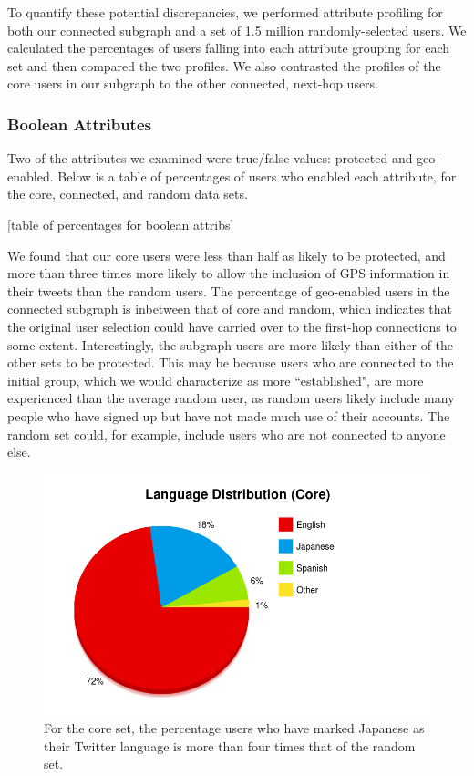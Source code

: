 To quantify these potential discrepancies, we performed attribute profiling for both our connected subgraph and a set of 1.5 million randomly-selected users.  We calculated the percentages of users falling into each attribute grouping for each set and then compared the two profiles.  We also contrasted the profiles of the core users in our subgraph to the other connected, next-hop users.

\subsubsection{Boolean Attributes}

Two of the attributes we examined were true/false values: protected and geo-enabled.  Below is a table of percentages of users who enabled each attribute, for the core, connected, and random data sets.

[table of percentages for boolean attribs]

We found that our core users were less than half as likely to be protected, and more than three times more likely to allow the inclusion of GPS information in their tweets than the random users.  The percentage of geo-enabled users in the connected subgraph is inbetween that of core and random, which indicates that the original user selection could have carried over to the first-hop connections to some extent.  Interestingly, the subgraph users are more likely than either of the other sets to be protected.  This may be because users who are connected to the initial group, which we would characterize as more ``established", are more experienced than the average random user, as random users likely include many people who have signed up but have not made much use of their accounts.  The random set could, for example, include users who are not connected to anyone else.

\begin{figure}[h]
 \centering
 \includegraphics[bb=0 0 800 500,scale=.2]{./images/lang-core.png}
 \caption{For the core set, the percentage users who have marked Japanese as their Twitter language is more than four times that of the random set.}
\end{figure}

